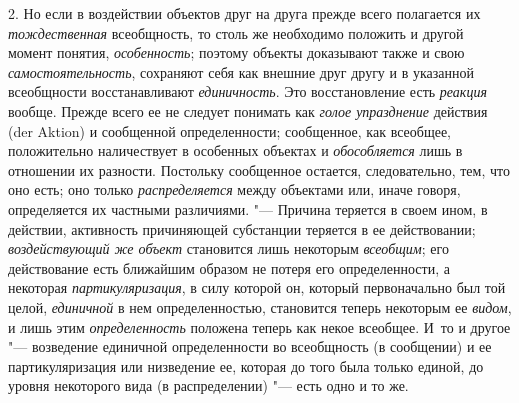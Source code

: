 2. Но если в воздействии объектов друг на друга прежде всего
полагается их {\em тождественная}
всеобщность, то столь же необходимо положить и другой момент
понятия, {\em особенность};
поэтому объекты доказывают также и свою
{\em самостоятельность},
сохраняют себя как внешние друг другу и в указанной
всеобщности восстанавливают
{\em единичность}. Это
восстановление есть {\em реакция}
вообще. Прежде всего ее не следует понимать
как {\em голое упразднение}
действия (der Aktion) и сообщенной
определенности; сообщенное, как всеобщее, положительно наличествует в
особенных объектах и {\em обособляется}
лишь в отношении их разности. Постольку сообщенное остается,
следовательно, тем, что оно есть; оно только
{\em распределяется}
между объектами или, иначе говоря, определяется их частными
различиями. "--- Причина теряется в своем ином, в действии,
активность причиняющей субстанции теряется в ее действовании;
{\em воздействующий же объект}
становится лишь некоторым
{\em всеобщим}; его
действование есть ближайшим образом не потеря его определенности, а
некоторая {\em партикуляризация},
в силу которой он, который первоначально был той целой,
{\em единичной} в нем
определенностью, становится теперь некоторым ее
{\em видом}, и лишь этим
{\em определенность}
положена теперь как некое всеобщее. И~то и другое
"--- возведение единичной определенности во всеобщность (в
сообщении) и ее партикуляризация или низведение ее, которая до того была
только единой, до уровня некоторого вида (в распределении)
"--- есть одно и то
же.

